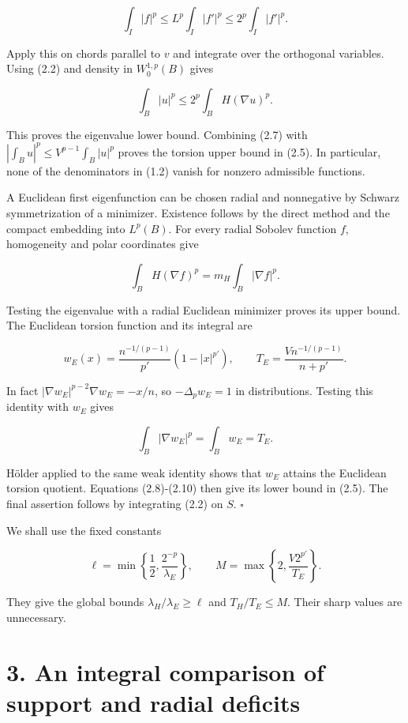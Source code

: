 \documentclass[11pt]{article}
\begin{document}
\[
\int_I|f|^p\leq L^p\int_I|f'|^p
\leq2^p\int_I|f'|^p.
\tag{2.6}
\]

Apply this on chords parallel to \(v\) and integrate over the orthogonal
variables. Using (2.2) and density in \(W^{1,p}_0(B)\) gives

\[
\int_B|u|^p\leq2^p\int_BH(\nabla u)^p.
\tag{2.7}
\]

This proves the eigenvalue lower bound. Combining (2.7) with
\(|\int_Bu|^p\leq V^{p-1}\int_B|u|^p\) proves the torsion upper bound in
(2.5). In particular, none of the denominators in (1.2) vanish for
nonzero admissible functions.

A Euclidean first eigenfunction can be chosen radial and nonnegative by
Schwarz symmetrization of a minimizer. Existence follows by the direct
method and the compact embedding into \(L^p(B)\). For every radial
Sobolev function \(f\), homogeneity and polar coordinates give

\[
\int_BH(\nabla f)^p=m_H\int_B|\nabla f|^p.
\tag{2.8}
\]

Testing the eigenvalue with a radial Euclidean minimizer proves its
upper bound. The Euclidean torsion function and its integral are

\[
w_E(x)=\frac{n^{-1/(p-1)}}{p'}(1-|x|^{p'}),
\qquad
T_E=\frac{V n^{-1/(p-1)}}{n+p'}.
\tag{2.9}
\]

In fact \(|\nabla w_E|^{p-2}\nabla w_E=-x/n\), so \(-\Delta_pw_E=1\) in
distributions. Testing this identity with \(w_E\) gives

\[
\int_B|\nabla w_E|^p=\int_Bw_E=T_E.
\tag{2.10}
\]

Hölder applied to the same weak identity shows that \(w_E\) attains the
Euclidean torsion quotient. Equations (2.8)-(2.10) then give its lower
bound in (2.5). The final assertion follows by integrating (2.2) on
\(S\). \(\square\)

We shall use the fixed constants

\[
\ell=\min\left\{\frac12,\frac{2^{-p}}{\lambda_E}\right\},
\qquad
M=\max\left\{2,\frac{V2^{p'}}{T_E}\right\}.
\tag{2.11}
\]

They give the global bounds \(\lambda_H/\lambda_E\geq\ell\) and
\(T_H/T_E\leq M\). Their sharp values are unnecessary.

\section{3. An integral comparison of support and radial
deficits}\label{an-integral-comparison-of-support-and-radial-deficits}
\end{document}
